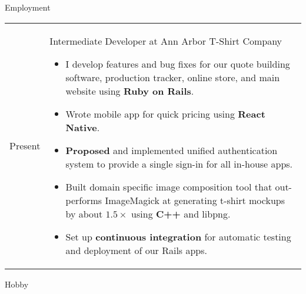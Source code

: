 \documentclass[12pt]{article}
\renewcommand{\section}[1]{{\Huge{#1}}\vspace{2 mm}}
\newenvironment{timeline}
        {\begin{tabular}{p{21 mm}|p{150 mm}}}
        {\end{tabular}}
\newenvironment{timelinetitle}
        {\vspace{-2 mm}\begin{large}}
        {\end{large}\vspace{-1.5 mm}}
\newcommand{\timespan}[2]{{#2}\newline{#1}}
\begin{document}
\vspace{3.0 mm}
\section{Employment}
\hline

\begin{timeline}
\timespan{Winter 2014}{Present}
&
\begin{timelinetitle}
    Intermediate Developer at Ann Arbor T-Shirt Company
\end{timelinetitle}
\begin{itemize}
  \item I develop features and bug fixes for our quote building software,
        production tracker, online store, and main website using \textbf{Ruby on Rails}.

  \item Wrote mobile app for quick pricing using \textbf{React Native}.

  \item \textbf{Proposed} and implemented unified authentication system to provide a single
        sign-in for all in-house apps.

  \item Built domain specific image composition tool that out-performs ImageMagick
        at generating t-shirt mockups by about $1.5\times$ using \textbf{C++} and libpng.

  \item Set up \textbf{continuous integration} for automatic testing and deployment of
        our Rails apps.
\end{itemize}

\end{timeline}

\vspace{3.0 mm}
\section{Hobby}
\hline
\end{document}
